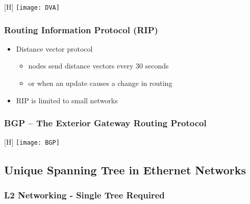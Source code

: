 \documentclass[../resumosRCOM.tex]{subfiles}
\begin{document}
\begin{center}[H]
    \texttt{[image: DVA]}    
\end{center}

\subsubsection{Routing Information Protocol (RIP)}

\begin{itemize}
    \item Distance vector protocol
    \begin{itemize}
        \item nodes send distance vectors every 30 seconds
        \item or when an update causes a change in routing
    \end{itemize}
    \item RIP is limited to small networks
\end{itemize}

\subsubsection{BGP – The Exterior Gateway Routing Protocol}

\begin{center}[H]
    \texttt{[image: BGP]}
\end{center}

\subsection{Unique Spanning Tree in Ethernet Networks}

\subsubsection{L2 Networking - Single Tree Required}
\end{document}
